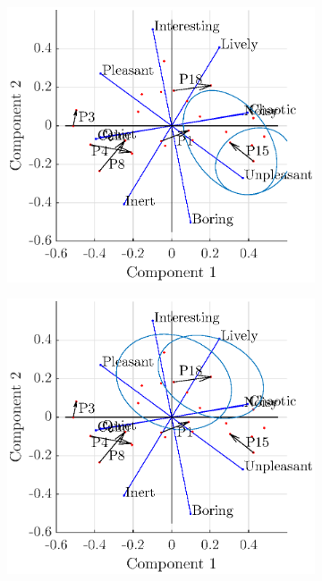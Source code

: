 \documentclass[11pt,a4paper]{article}
\begin{document}
\begin{figure}[h]
    \centering
     \begin{subfigure}[t]{0.45\textwidth}
        \centering
        \includegraphics[width=\textwidth]{figures/pca_p15.eps}
    \end{subfigure}%
    \begin{subfigure}[t]{0.45\textwidth}
        \centering
        \includegraphics[width=\textwidth]{figures/pca_p18.eps}
    \end{subfigure}
\end{figure}
\end{document}
